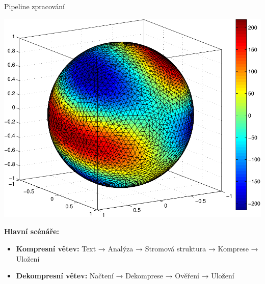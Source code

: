 \documentclass[lualatex,hyperref={pdfencoding=auto}]{beamer}
\begin{document}
\begin{frame}{Pipeline zpracování}
  \begin{center}
    \includegraphics[width=\textwidth]{fig/sphere_mix_real.pdf}
  \end{center}
  \vspace{3mm}
  \textbf{Hlavní scénáře:}
  \begin{itemize}
    \item \textbf{Kompresní větev:} Text → Analýza → Stromová struktura → Komprese → Uložení
    \item \textbf{Dekompresní větev:} Načtení → Dekomprese → Ověření → Uložení
  \end{itemize}
\end{frame}
\end{document}
